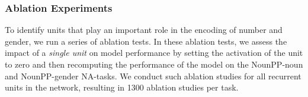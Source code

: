 \subsubsection{Ablation Experiments}
To identify units that play an important role in the encoding of number and gender, we run a series of ablation tests.
In these ablation tests, we assess the impact of a \emph{single unit} on model performance by setting the activation of the unit to zero and then recomputing the performance of the model on the NounPP-noun and NounPP-gender NA-tasks. 
We conduct such ablation studies for all recurrent units in the network, resulting in 1300 ablation studies per task.

